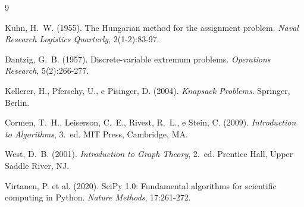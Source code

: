 \documentclass[12pt,a4paper]{article}
\begin{document}
\begin{thebibliography}{9}

Kuhn, H.~W. (1955).
The Hungarian method for the assignment problem.
\textit{Naval Research Logistics Quarterly}, 2(1-2):83-97.

Dantzig, G.~B. (1957).
Discrete-variable extremum problems.
\textit{Operations Research}, 5(2):266-277.

Kellerer, H., Pferschy, U., e Pisinger, D. (2004).
\textit{Knapsack Problems}.
Springer, Berlin.

Cormen, T.~H., Leiserson, C.~E., Rivest, R.~L., e Stein, C. (2009).
\textit{Introduction to Algorithms}, 3.~ed.
MIT Press, Cambridge, MA.

West, D.~B. (2001).
\textit{Introduction to Graph Theory}, 2.~ed.
Prentice Hall, Upper Saddle River, NJ.

Virtanen, P. et al. (2020).
SciPy 1.0: Fundamental algorithms for scientific computing in Python.
\textit{Nature Methods}, 17:261-272.

\end{thebibliography}
\end{document}
